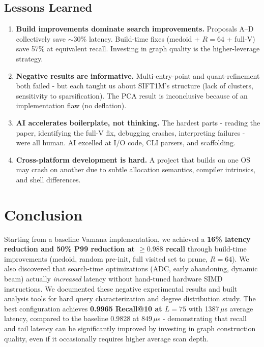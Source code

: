 \documentclass[10pt]{article}
\begin{document}
\subsection{Lessons Learned}

\begin{enumerate}
    \item \textbf{Build improvements dominate search improvements.} Proposals A--D collectively save $\sim$30\% latency. Build-time fixes (medoid + $R=64$ + full-V) save 57\% at equivalent recall. Investing in graph quality is the higher-leverage strategy.
    
    \item \textbf{Negative results are informative.} Multi-entry-point and quant-refinement both failed - but each taught us about SIFT1M's structure (lack of clusters, sensitivity to sparsification). The PCA result is inconclusive because of an implementation flaw (no deflation).
    
    \item \textbf{AI accelerates boilerplate, not thinking.} The hardest parts - reading the paper, identifying the full-V fix, debugging crashes, interpreting failures - were all human. AI excelled at I/O code, CLI parsers, and scaffolding.
    
    \item \textbf{Cross-platform development is hard.} A project that builds on one OS may crash on another due to subtle allocation semantics, compiler intrinsics, and shell differences.
\end{enumerate}

\section{Conclusion}

Starting from a baseline Vamana implementation, we achieved a \textbf{16\% latency reduction and 50\% P99 reduction at $\ge 0.988$ recall} through build-time improvements (medoid, random pre-init, full visited set to prune, $R=64$). We also discovered that search-time optimizations (ADC, early abandoning, dynamic beam) actually \emph{increased} latency without hand-tuned hardware SIMD instructions. We documented these negative experimental results and built analysis tools for hard query characterization and degree distribution study. The best configuration achieves \textbf{0.9965 Recall@10 at $L=75$} with 1387\,$\mu$s average latency, compared to the baseline 0.9828 at 849\,$\mu$s - demonstrating that recall and tail latency can be significantly improved by investing in graph construction quality, even if it occasionally requires higher average scan depth.
\end{document}
